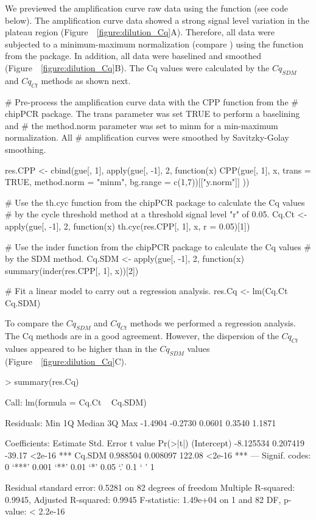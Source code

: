 We previewed the amplification curve raw data using the  
function (see code below). The amplification curve data showed a strong signal 
level variation in the plateau region (Figure~~\ref{figure:dilution_Cq}A). 
Therefore, all data were subjected to a minimum-maximum normalization (compare 
\citet{roediger_RJ_2013}) using the  function from the 
 package. In addition, all data were baselined and smoothed 
(Figure~~\ref{figure:dilution_Cq}B). The Cq values were calculated by the 
$Cq_{SDM}$ and $Cq_{Ct}$ methods as shown next.

\begin{example}
# Pre-process the amplification curve data with the CPP function from the 
# chipPCR package. The trans parameter was set TRUE to perform a baselining and 
# the method.norm parameter was set to minm for a min-maximum normalization. All
# amplification curves were smoothed by Savitzky-Golay smoothing.

res.CPP <- cbind(gue[, 1], apply(gue[, -1], 2, function(x) {
  CPP(gue[, 1], x, trans = TRUE, method.norm = "minm", 
      bg.range = c(1,7))[["y.norm"]]
}))

# Use the th.cyc function from the chipPCR package to calculate the Cq values
# by the cycle threshold method at a threshold signal level "r" of 0.05.
Cq.Ct <- apply(gue[, -1], 2, function(x) 
  th.cyc(res.CPP[, 1], x, r = 0.05)[1])

# Use the inder function from the chipPCR package to calculate the Cq values
# by the SDM method.
Cq.SDM <- apply(gue[, -1], 2, function(x)
  summary(inder(res.CPP[, 1], x))[2])

# Fit a linear model to carry out a regression analysis.
res.Cq <- lm(Cq.Ct ~ Cq.SDM)
\end{example}

To compare the $Cq_{SDM}$ and $Cq_{Ct}$ methods we performed a regression 
analysis. The Cq methods are in a good agreement. However, the dispersion of the 
$Cq_{Ct}$ values appeared to be higher than in the $Cq_{SDM}$ values 
(Figure~~\ref{figure:dilution_Cq}C).

\begin{example}
> summary(res.Cq)

Call:
lm(formula = Cq.Ct ~ Cq.SDM)

Residuals:
    Min      1Q  Median      3Q     Max 
-1.4904 -0.2730  0.0601  0.3540  1.1871 

Coefficients:
             Estimate Std. Error t value Pr(>|t|)    
(Intercept) -8.125534   0.207419  -39.17   <2e-16 ***
Cq.SDM       0.988504   0.008097  122.08   <2e-16 ***
---
Signif. codes:  0 ‘***’ 0.001 ‘**’ 0.01 ‘*’ 0.05 ‘.’ 0.1 ‘ ’ 1

Residual standard error: 0.5281 on 82 degrees of freedom
Multiple R-squared:  0.9945,	Adjusted R-squared:  0.9945 
F-statistic: 1.49e+04 on 1 and 82 DF,  p-value: < 2.2e-16
\end{example}

